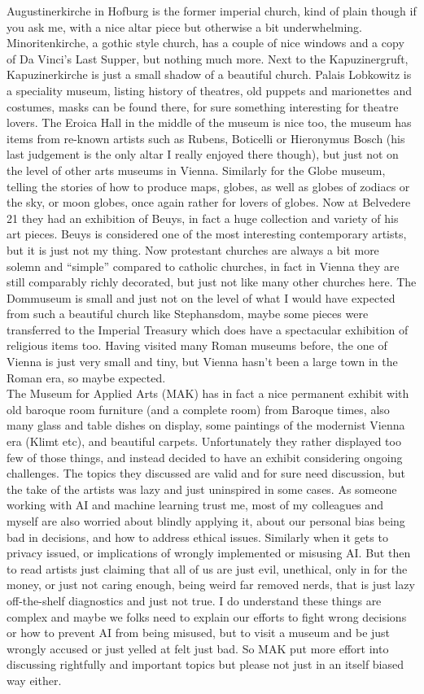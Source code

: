 Augustinerkirche in Hofburg is the former imperial church, kind of plain though if you ask me, with a nice altar piece but otherwise a bit underwhelming. Minoritenkirche, a gothic style church, has a couple of nice windows and a copy of Da Vinci's Last Supper, but nothing much more. Next to the Kapuzinergruft, Kapuzinerkirche is just a small shadow of a beautiful church. Palais Lobkowitz is a speciality museum, listing history of theatres, old puppets and marionettes and costumes, masks can be found there, for sure something interesting for theatre lovers. The Eroica Hall in the middle of the museum is nice too, the museum has items from re-known artists such as Rubens, Boticelli or Hieronymus Bosch (his last judgement is the only altar I really enjoyed there though), but just not on the level of other arts museums in Vienna. Similarly for the Globe museum, telling the stories of how to produce maps, globes, as well as globes of zodiacs or the sky, or moon globes, once again rather for lovers of globes. Now at Belvedere 21 they had an exhibition of Beuys, in fact a huge collection and variety of his art pieces. Beuys is considered one of the most interesting contemporary artists, but it is just not my thing. Now protestant churches are always a bit more solemn and ``simple'' compared to catholic churches, in fact in Vienna they are still comparably richly decorated, but just not like many other churches here. The Dommuseum is small and just not on the level of what I would have expected from such a beautiful church like Stephansdom, maybe some pieces were transferred to the Imperial Treasury which does have a spectacular exhibition of religious items too. Having visited many Roman museums before, the one of Vienna is just very small and tiny, but Vienna hasn't been a large town in the Roman era, so maybe expected.\\
The Museum for Applied Arts (MAK) has in fact a nice permanent exhibit with old baroque room furniture (and a complete room) from Baroque times, also many glass and table dishes on display, some paintings of the modernist Vienna era (Klimt etc), and beautiful carpets. Unfortunately they rather displayed too few of those things, and instead decided to have an exhibit considering ongoing challenges. The topics they discussed are valid and for sure need discussion, but the take of the artists was lazy and just uninspired in some cases. As someone working with AI and machine learning trust me, most of my colleagues and myself are also worried about blindly applying it, about our personal bias being bad in decisions, and how to address ethical issues. Similarly when it gets to privacy issued, or implications of wrongly implemented or misusing AI. But then to read artists just claiming that all of us are just evil, unethical, only in for the money, or just not caring enough, being weird far removed nerds, that is just lazy off-the-shelf diagnostics and just not true. I do understand these things are complex and maybe we folks need to explain our efforts to fight wrong decisions or how to prevent AI from being misused, but to visit a museum and be just wrongly accused or just yelled at felt just bad. So MAK put more effort into discussing rightfully and important topics but please not just in an itself biased way either.\\
